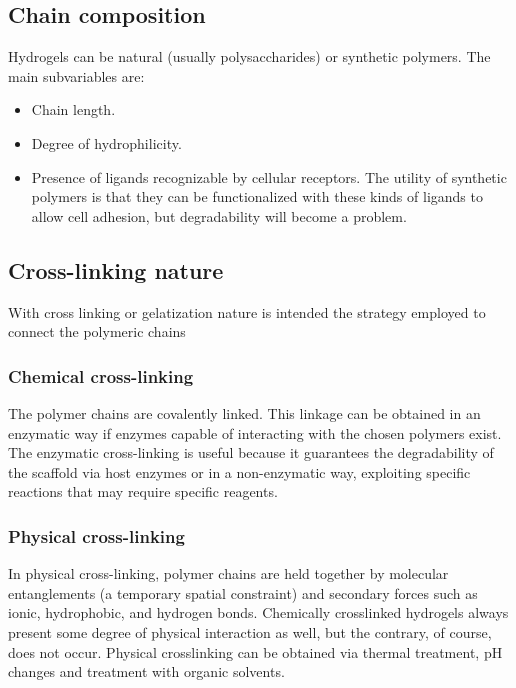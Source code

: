 	\subsection{Chain composition}
	Hydrogels can be natural (usually polysaccharides) or synthetic polymers.
	The main subvariables are:

	\begin{multicols}{2}
		\begin{itemize}
			\item Chain length.
			\item Degree of hydrophilicity.
			\item Presence of ligands recognizable by cellular receptors.
				The utility of synthetic polymers is that they can be functionalized with these kinds of ligands to allow cell adhesion, but degradability will become a problem.
		\end{itemize}
	\end{multicols}

	\subsection{Cross-linking nature}
	With cross linking or gelatization nature is intended the strategy employed to connect the polymeric chains

		\subsubsection{Chemical cross-linking}
		The polymer chains are covalently linked.
		This linkage can be obtained in an enzymatic way if enzymes capable of interacting with the chosen polymers exist.
		The enzymatic cross-linking is useful because it guarantees the degradability of the scaffold via host enzymes or in a non-enzymatic way, exploiting specific reactions that may require specific reagents.

		\subsubsection{Physical cross-linking}
		In physical cross-linking, polymer chains are held together by molecular entanglements (a temporary spatial constraint) and secondary forces such as ionic, hydrophobic, and hydrogen bonds.
		Chemically crosslinked hydrogels always present some degree of physical interaction as well, but the contrary, of course, does not occur.
		Physical crosslinking can be obtained via thermal treatment, pH changes and treatment with organic solvents.

